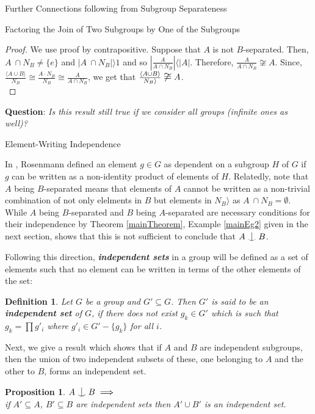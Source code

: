 \documentclass{article}
\newtheorem{definition}{Definition}[section]
\newtheorem{proposition}{Proposition}[section]
\def\indep{\mathrel{\raise0.2ex\hbox{\ooalign{\hidewidth$\vert$\hidewidth\cr\raise-0.9ex\hbox{$\smile$}}}}}
\begin{document}
\begin{section}{Further Connections following from Subgroup Separateness}
\begin{subsection}{Factoring the Join of Two Subgroups by One of the Subgroups}
			\begin{proof}
				We use proof by contrapositive. Suppose that $A$ is not $B$-separated. Then, $A \ \cap  N_B  \not= \{e\}$ and $|A \ \cap  N_B | \rangle  1$ and so {\large$ |\frac{A}{A \cap  N_B}| \langle |A|$}. Therefore, {\large$\frac{A}{A \cap  N_B } \not \cong A$}. Since, {\large	$\frac{\langle A\cup B\rangle }{N_B } \cong \frac{A \cdot  N_B }{N_B } \cong \frac{A}{A \cap  N_B }$}, we get that {$\large \frac{\langle A\cup B\rangle }{N_B\rangle } \not \cong A$.}\\
			\end{proof}
			
			\noindent \textbf{Question}: \textit{Is this result still true if we consider all groups (infinite ones as well)?}
			
		\end{subsection}
		
		
		
		
		\begin{subsection}{Element-Writing Independence}
			
			In \cite{MainC2}, Rosenmann defined an element $g \in G$ as dependent on a subgroup $H$ of $G$ if $g$ can be written as a non-identity product of elements of $H$. Relatedly, note that $A$ being $B$-separated means that elements of $A$ cannot be written as a non-trivial combination of not only elelments in $B$ but elements in $N_B\rangle $ as $A \ \cap N_B = \emptyset$. While $A$ being $B$-separated and $B$ being $A$-separated  are necessary conditions for their independence by Theorem \ref{mainTheorem},  Example \ref{mainEg2} given in the  next section, shows that this is not sufficient to conclude that $A\indep B$. 
			
			Following this direction, \textbf{\textit{independent sets}} in a group will be defined as a set of elements such that no element can be written in terms of the other elements of the set:
			
			
			
			\begin{definition}
				Let $G$ be a group and $G' \subseteq G$. Then $G'$ is said to be an\textbf{ independent set} of $G$, if there does not exist $g_k \in G'$ which is such that $g_k= \prod g'_i$ where $g'_i \in G' - \{g_k\}$ for all $i$.
			\end{definition}
			
			\noindent Next, we give a result which shows that if $A$ and $B$ are independent subgroups, then the union of two independent subsets of these, one belonging to $A$ and the other to $B$, forms an independent set. 
			\begin{proposition}
				$A \indep B \implies$ \\
				if  $A' \subseteq A$, $B' \subseteq B$  are independent sets then  $A' \cup B'$ is an independent set.
			\end{proposition}
			

\end{subsection}
\end{section}
\end{document}

